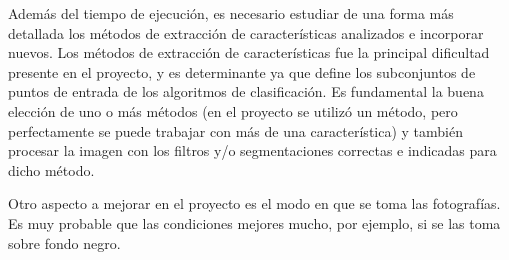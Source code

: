 \documentclass[10pt,a4paper]{article}
\begin{document}
Además del tiempo de ejecución, es necesario estudiar de una forma más detallada los métodos de extracción de características analizados e incorporar nuevos. Los métodos de extracción de características fue la principal dificultad presente en el proyecto, y es determinante ya que define los subconjuntos de puntos de entrada de los algoritmos de clasificación. Es fundamental la buena elección de uno o más métodos (en el proyecto se utilizó un método, pero perfectamente se puede trabajar con más de una característica) y también procesar la imagen con los filtros y/o segmentaciones correctas e indicadas para dicho método. 

Otro aspecto a mejorar en el proyecto es el modo en que se toma las fotografías. Es muy probable que las condiciones mejores mucho, por ejemplo, si se las toma sobre fondo negro.

\printbibliography

\newpage
\tableofcontents
\end{document}
